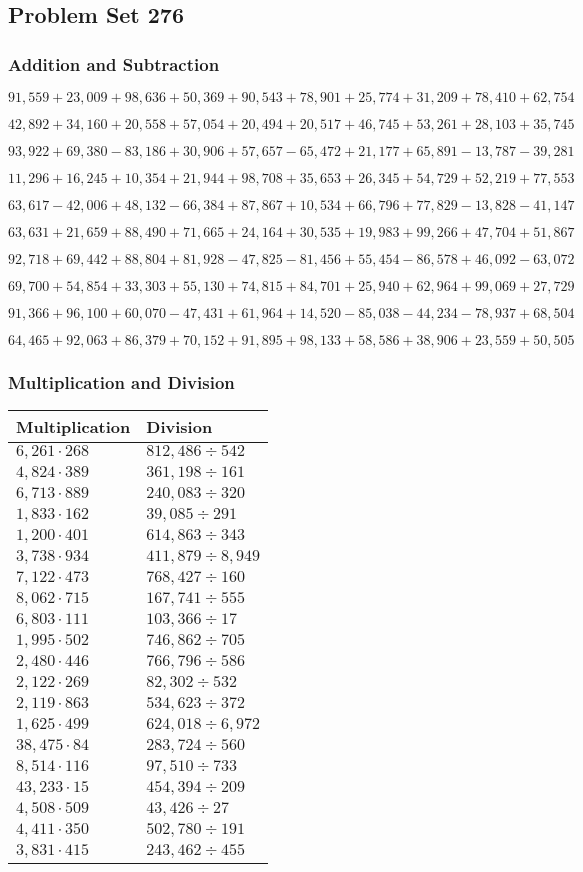 \hypertarget{problem-set-276}{%
\subsection{Problem Set 276}\label{problem-set-276}}

\hypertarget{addition-and-subtraction}{%
\subsubsection{Addition and
Subtraction}\label{addition-and-subtraction}}

\(91,559+23,009+98,636+50,369+90,543+78,901+25,774+31,209+78,410+62,754\)

\(42,892+34,160+20,558+57,054+20,494+20,517+46,745+53,261+28,103+35,745\)

\(93,922+69,380-83,186+30,906+57,657-65,472+21,177+65,891-13,787-39,281\)

\(11,296+16,245+10,354+21,944+98,708+35,653+26,345+54,729+52,219+77,553\)

\(63,617-42,006+48,132-66,384+87,867+10,534+66,796+77,829-13,828-41,147\)

\(63,631+21,659+88,490+71,665+24,164+30,535+19,983+99,266+47,704+51,867\)

\(92,718+69,442+88,804+81,928-47,825-81,456+55,454-86,578+46,092-63,072\)

\(69,700+54,854+33,303+55,130+74,815+84,701+25,940+62,964+99,069+27,729\)

\(91,366+96,100+60,070-47,431+61,964+14,520-85,038-44,234-78,937+68,504\)

\(64,465+92,063+86,379+70,152+91,895+98,133+58,586+38,906+23,559+50,505\)

\hypertarget{multiplication-and-division}{%
\subsubsection{Multiplication and
Division}\label{multiplication-and-division}}

\begin{longtable}[]{@{}ll@{}}
\toprule
Multiplication & Division\tabularnewline
\midrule
\endhead
\(6,261\cdot268\) & \(812,486÷542\)\tabularnewline
\(4,824\cdot389\) & \(361,198÷161\)\tabularnewline
\(6,713\cdot889\) & \(240,083÷320\)\tabularnewline
\(1,833\cdot162\) & \(39,085÷291\)\tabularnewline
\(1,200\cdot401\) & \(614,863÷343\)\tabularnewline
\(3,738\cdot934\) & \(411,879÷8,949\)\tabularnewline
\(7,122\cdot473\) & \(768,427÷160\)\tabularnewline
\(8,062\cdot715\) & \(167,741÷555\)\tabularnewline
\(6,803\cdot111\) & \(103,366÷17\)\tabularnewline
\(1,995\cdot502\) & \(746,862÷705\)\tabularnewline
\(2,480\cdot446\) & \(766,796÷586\)\tabularnewline
\(2,122\cdot269\) & \(82,302÷532\)\tabularnewline
\(2,119\cdot863\) & \(534,623÷372\)\tabularnewline
\(1,625\cdot499\) & \(624,018÷6,972\)\tabularnewline
\(38,475\cdot84\) & \(283,724÷560\)\tabularnewline
\(8,514\cdot116\) & \(97,510÷733\)\tabularnewline
\(43,233\cdot15\) & \(454,394÷209\)\tabularnewline
\(4,508\cdot509\) & \(43,426÷27\)\tabularnewline
\(4,411\cdot350\) & \(502,780÷191\)\tabularnewline
\(3,831\cdot415\) & \(243,462÷455\)\tabularnewline
\bottomrule
\end{longtable}
